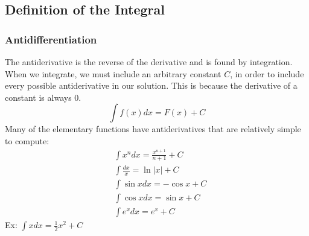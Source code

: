 \subsection{Definition of the Integral}
\subsubsection{Antidifferentiation}
The antiderivative is the reverse of the derivative and is found by integration. When we integrate, we must include an arbitrary constant $C$, in order to include every possible antiderivative in our solution. This is because the derivative of a constant is always 0.
$$\int f(x)dx=F(x)+C$$
Many of the elementary functions have antiderivatives that are relatively simple to compute:
\begin{align*}
    &\int x^ndx=\frac{x^{n+1}}{n+1}+C\\
    &\int \frac{dx}{x}=\ln|x|+C\\
    &\int \sin{x} dx=-\cos x+C\\
    &\int \cos{x} dx=\sin x+C\\
    &\int e^xdx=e^x+C
\end{align*}
Ex: $\int xdx=\frac{1}{2}x^2+C$\\
